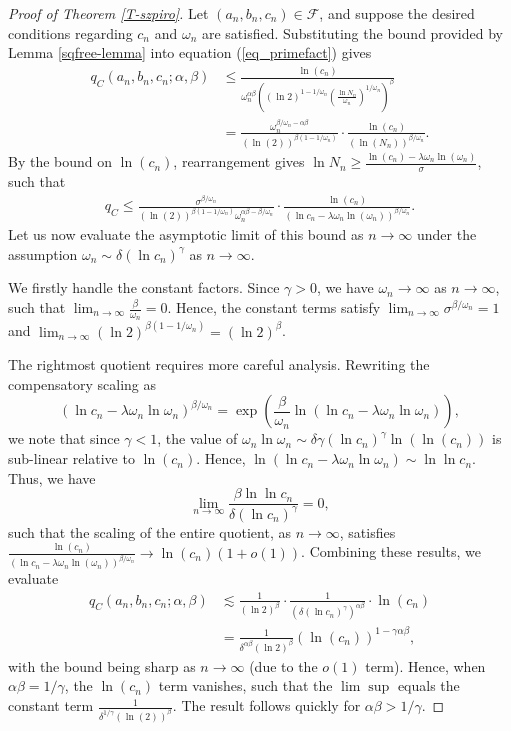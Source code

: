 \documentclass[10pt,a4paper]{amsart}
\def\ra{\rightarrow}
\begin{document}
\begin{proof}[Proof of Theorem \ref{T-szpiro}]
Let $(a_n, b_n, c_n) \in \mathcal{F}$, and suppose the desired conditions regarding $c_n$ and $\omega_n$ are satisfied. Substituting the bound provided by Lemma \ref{sqfree-lemma} into equation (\ref{eq_primefact}) gives
\begin{align*}
    q_C(a_n, b_n, c_n; \alpha, \beta) &\leq \frac{\ln (c_n)}{\omega_n^{\alpha\beta} \left( (\ln 2)^{1 - 1/\omega_n} \left(\frac{\ln N_n}{\omega_n}\right)^{1/\omega_n} \right)^\beta}\\ & = \frac{\omega_n^{\beta/\omega_n - \alpha\beta}}{(\ln (2))^{\beta(1 - 1/\omega_n)}} \cdot \frac{\ln (c_n)}{(\ln (N_n))^{\beta/\omega_n}}.
\end{align*}
By the bound on $\ln(c_n)$, rearrangement gives $\ln N_n \ge \frac{\ln (c_n) - \lambda \omega_n \ln (\omega_n)}{\sigma}$, such that
\begin{align*}
    q_C \le \frac{\sigma^{\beta/\omega_n}}{(\ln (2))^{\beta(1 - 1/\omega_n)} \omega_n^{\alpha\beta - \beta/\omega_n}} \cdot \frac{\ln (c_n)}{(\ln c_n - \lambda \omega_n \ln (\omega_n))^{\beta/\omega_n}}.
\end{align*}
Let us now evaluate the asymptotic limit of this bound as $n \ra \infty$ under the assumption $\omega_n \sim \delta (\ln c_n)^\gamma$ as $n \to \infty$. 

We firstly handle the constant factors. Since $\gamma > 0$, we have $\omega_n \ra \infty$ as $n \ra \infty$, such that $\lim_{n \to \infty} \frac{\beta}{\omega_n} = 0$. Hence, the constant terms satisfy $\lim_{n \to \infty} \sigma^{\beta/\omega_n} = 1$ and $\lim_{n \to \infty} (\ln 2)^{\beta(1 - 1/\omega_n)} = (\ln 2)^\beta$.

The rightmost quotient requires more careful analysis. Rewriting the compensatory scaling as
\[
    (\ln c_n - \lambda \omega_n \ln \omega_n)^{\beta/\omega_n} = \exp\left( \frac{\beta}{\omega_n} \ln(\ln c_n - \lambda \omega_n \ln \omega_n) \right),
\]
we note that since $\gamma < 1$, the value of $\omega_n \ln \omega_n \sim \delta \gamma (\ln c_n)^\gamma \ln(\ln(c_n))$ is sub-linear relative to $\ln(c_n)$. Hence, $\ln(\ln c_n - \lambda \omega_n \ln \omega_n) \sim \ln \ln c_n$. Thus, we have
\[
    \lim_{n \to \infty} \frac{\beta \ln \ln c_n}{\delta (\ln c_n)^\gamma} = 0,
\]
such that the scaling of the entire quotient, as $n \ra \infty$, satisfies $\frac{\ln (c_n)}{(\ln c_n - \lambda \omega_n \ln (\omega_n))^{\beta/\omega_n}} \ra \ln(c_n) (1 + o(1))$. Combining these results, we evaluate
\begin{align*}
    q_C(a_n, b_n, c_n; \alpha, \beta) &\lesssim \frac{1}{(\ln 2)^\beta} \cdot \frac{1}{(\delta (\ln c_n)^\gamma)^{\alpha\beta}} \cdot \ln (c_n) \\ &= \frac{1}{\delta^{\alpha\beta} (\ln 2)^\beta} (\ln (c_n))^{1 - \gamma \alpha \beta},
\end{align*}
with the bound being sharp as $n \ra \infty$ (due to the $o(1)$ term). Hence, when $\alpha \beta = 1/\gamma$, the $\ln(c_n)$ term vanishes, such that the $\lim\sup$ equals the constant term $\frac{1}{\delta^{1/\gamma} (\ln(2))^{\beta}}$. The result follows quickly for $\alpha \beta > 1/\gamma$.
\end{proof}
\end{document}
